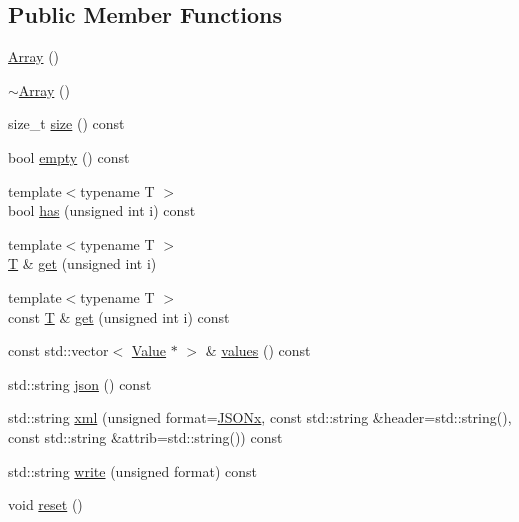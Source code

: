 \subsection*{Public Member Functions}
\begin{DoxyCompactItemize}
\item 
\hyperlink{classjsonxx_1_1_array_a3b3cdb6b0c83d0f348f04f551595dfb3}{Array} ()
\item 
\hyperlink{classjsonxx_1_1_array_a8e93b44595aed126f26a396540b61ea7}{$\sim$\+Array} ()
\item 
size\+\_\+t \hyperlink{classjsonxx_1_1_array_a525ba16b450422c39a90c346496676f6}{size} () const 
\item 
bool \hyperlink{classjsonxx_1_1_array_a164966e763f9d8aa74b226845f97cde6}{empty} () const 
\item 
{\footnotesize template$<$typename T $>$ }\\bool \hyperlink{classjsonxx_1_1_array_a5acabe14f95a52c755339240d59a7406}{has} (unsigned int i) const 
\item 
{\footnotesize template$<$typename T $>$ }\\\hyperlink{http__parser_8c_ad24d0de3f597ca60dd95c4bc59c2ff73}{T} \& \hyperlink{classjsonxx_1_1_array_a74a00c6b219ecffc4e70c95f81c2b9b6}{get} (unsigned int i)
\item 
{\footnotesize template$<$typename T $>$ }\\const \hyperlink{http__parser_8c_ad24d0de3f597ca60dd95c4bc59c2ff73}{T} \& \hyperlink{classjsonxx_1_1_array_aeea14707c45c801b9ac2735fcbc32a19}{get} (unsigned int i) const 
\item 
const std\+::vector$<$ \hyperlink{classjsonxx_1_1_value}{Value} $\ast$ $>$ \& \hyperlink{classjsonxx_1_1_array_a98b406fd55e177daa00600f5f0040718}{values} () const 
\item 
std\+::string \hyperlink{classjsonxx_1_1_array_a3245276b73108f6b15eb0a14ba5c847a}{json} () const 
\item 
std\+::string \hyperlink{classjsonxx_1_1_array_aeac2026e7569cf4bd465daec6162d719}{xml} (unsigned format=\hyperlink{namespacejsonxx_a1dc6d8d59422ab47976163f874939455af38f9355cff13d4780a62c136d156160}{J\+S\+O\+Nx}, const std\+::string \&header=std\+::string(), const std\+::string \&attrib=std\+::string()) const 
\item 
std\+::string \hyperlink{classjsonxx_1_1_array_a93ef3fe0d272693649d0a4b446fa3158}{write} (unsigned format) const 
\item 
void \hyperlink{classjsonxx_1_1_array_a283d4558fa4c97159c96b721f71bef17}{reset} ()

\end{DoxyCompactItemize}
